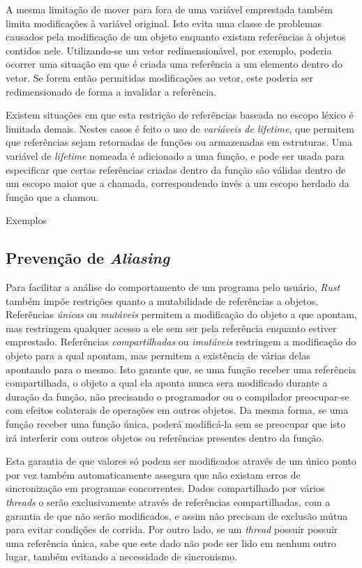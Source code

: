 \documentclass[tg]{mdtufsm}
\newcommand{\todo}[1]{\textsf{\color{red}#1}}
\begin{document}
A mesma limitação de mover para fora de uma variável emprestada também limita modificações à variável original. Isto evita uma classe de problemas causados pela modificação de um objeto enquanto existam referências à objetos contidos nele. Utilizando-se um vetor redimensionável, por exemplo, poderia ocorrer uma situação em que é criada uma referência a um elemento dentro do vetor. Se forem então permitidas modificações ao vetor, este poderia ser redimensionado de forma a invalidar a referência.

Existem situações em que esta restrição de referências baseada no escopo léxico é limitada demais. Nestes casos é feito o uso de \emph{variáveis de lifetime}, que permitem que referências sejam retornadas de funções ou armazenadas em estruturas. Uma variável de \emph{lifetime} nomeada é adicionado a uma função, e pode ser usada para especificar que certas referências criadas dentro da função são válidas dentro de um escopo maior que a chamada, correspondendo invés a um escopo herdado da função que a chamou. \citep{rust-lifetimes}

\todo{Exemplos}

\subsection{Prevenção de \emph{Aliasing}}

Para facilitar a análise do comportamento de um programa pelo usuário, \emph{Rust} também impõe restrições quanto a mutabilidade de referências a objetos. Referências \emph{únicas} ou \emph{mutáveis} permitem a modificação do objeto a que apontam, mas restringem qualquer acesso a ele sem ser pela referência enquanto estiver emprestado. Referências \emph{compartilhadas} ou \emph{imutáveis} restringem a modificação do objeto para a qual apontam, mas permitem a existência de várias delas apontando para o mesmo. Isto garante que, se uma função receber uma referência compartilhada, o objeto a qual ela aponta nunca sera modificado durante a duração da função, não precisando o programador ou o compilador preocupar-se com efeitos colaterais de operações em outros objetos. Da mesma forma, se uma função receber uma função única, poderá modificá-la sem se preocupar que isto irá interferir com outros objetos ou referências presentes dentro da função. \citep{rust-lifetimes}

Esta garantia de que valores só podem ser modificados através de um único ponto por vez também automaticamente assegura que não existam erros de sincronização em programas concorrentes. Dados compartilhado por vários \emph{threads} o serão exclusivamente através de referências compartilhadas, com a garantia de que não serão modificados, e assim não precisam de exclusão mútua para evitar condições de corrida. Por outro lado, se um \emph{thread} possuir possuir uma referência única, sabe que este dado não pode ser lido em nenhum outro lugar, também evitando a necessidade de sincronismo.
\end{document}
